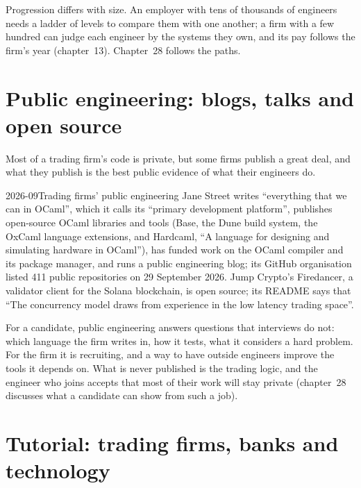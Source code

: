 Progression differs with size. An employer with tens of thousands of engineers needs a ladder of levels to compare them
with one another; a firm with a few hundred can judge each engineer by the systems they own, and its pay follows the
firm's year (chapter~13). Chapter~28 follows the paths.

\section{Public engineering: blogs, talks and open source}

Most of a trading firm's code is private, but some firms publish a great deal, and what they publish is the best public
evidence of what their engineers do.

\begin{dated}{2026-09}{Trading firms' public engineering}\label{dat:in:software-engineer:public}
Jane Street writes ``everything that we can in OCaml'', which it calls its ``primary development platform'', publishes
open-source OCaml libraries and tools (Base, the Dune build system, the OxCaml language extensions, and Hardcaml, ``A
language for designing and simulating hardware in OCaml''), has funded work on the OCaml compiler and its package manager,
and runs a public engineering blog; its GitHub organisation listed 411 public repositories on 29 September 2026. Jump
Crypto's Firedancer, a validator client for the Solana blockchain, is open source; its README says that ``The concurrency
model draws from experience in the low latency trading space''.
\end{dated}

For a candidate, public engineering answers questions that interviews do not: which language the firm writes in, how it
tests, what it considers a hard problem. For the firm it is recruiting, and a way to have outside engineers improve the
tools it depends on. What is never published is the trading logic, and the engineer who joins accepts that most of their
work will stay private (chapter~28 discusses what a candidate can show from such a job).

\section{Tutorial: trading firms, banks and technology}\label{tut:in:software-engineer:tut}

